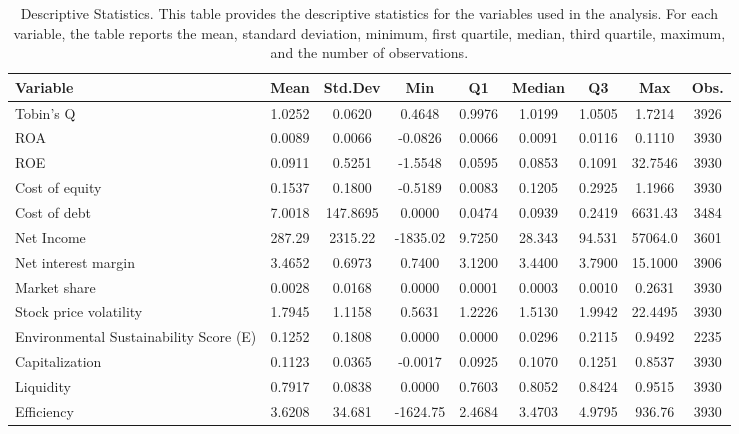 \documentclass[11pt, a4paper]{article}
\begin{document}
\begin{landscape}
\begin{table}[htbp]
\centering
\caption{Descriptive Statistics. This table provides the descriptive statistics for the variables used in the analysis. For each variable, the table reports the mean, standard deviation, minimum, first quartile, median, third quartile, maximum, and the number of observations.}
\label{table:2}
\renewcommand{\arraystretch}{1.6}
\begin{tabular}{lcccccccc}
\toprule
\multicolumn{1}{l}{\textbf{Variable}} &\multicolumn{1}{c}{\textbf{Mean}} &\multicolumn{1}{c}{\textbf{Std.Dev}} &\multicolumn{1}{c}{\textbf{Min}} &\multicolumn{1}{c}{\textbf{Q1}} &\multicolumn{1}{c}{\textbf{Median}} &\multicolumn{1}{c}{\textbf{Q3}} &\multicolumn{1}{c}{\textbf{Max}} &\multicolumn{1}{c}{\textbf{Obs.}} \\
\toprule
Tobin's Q  & 1.0252 & 0.0620 & 0.4648 & 0.9976 & 1.0199 & 1.0505 & 1.7214 & 3926 \\
ROA  & 0.0089 & 0.0066 & -0.0826 & 0.0066 & 0.0091 & 0.0116 & 0.1110 & 3930 \\
ROE  & 0.0911 & 0.5251 & -1.5548 & 0.0595 & 0.0853 & 0.1091 & 32.7546 & 3930 \\
Cost of equity & 0.1537 & 0.1800 & -0.5189 & 0.0083 & 0.1205 & 0.2925 & 1.1966 & 3930 \\
Cost of debt & 7.0018 & 147.8695 & 0.0000 & 0.0474 & 0.0939 & 0.2419 & 6631.43 & 3484 \\
Net Income & 287.29 & 2315.22 & -1835.02 & 9.7250 & 28.343 & 94.531 & 57064.0 & 3601 \\
Net interest margin & 3.4652  & 0.6973 & 0.7400 & 3.1200 & 3.4400 & 3.7900 & 15.1000 & 3906 \\
Market share & 0.0028 & 0.0168 & 0.0000 & 0.0001 & 0.0003 & 0.0010 & 0.2631 & 3930\\
Stock price volatility & 1.7945 & 1.1158 & 0.5631 & 1.2226 & 1.5130 & 1.9942 & 22.4495 & 3930 \\
Environmental Sustainability Score (E) & 0.1252 & 0.1808 & 0.0000 & 0.0000 & 0.0296 & 0.2115 & 0.9492 & 2235 \\
Capitalization & 0.1123 & 0.0365 & -0.0017 & 0.0925 & 0.1070 & 0.1251 & 0.8537 & 3930 \\
Liquidity & 0.7917 & 0.0838 & 0.0000 & 0.7603 & 0.8052 & 0.8424 & 0.9515 & 3930 \\
Efficiency & 3.6208 & 34.681 & -1624.75 & 2.4684 & 3.4703 & 4.9795 & 936.76 & 3930 \\
\bottomrule
\end{tabular}
\renewcommand{\arraystretch}{1}
\end{table}
\end{landscape}
\end{document}
